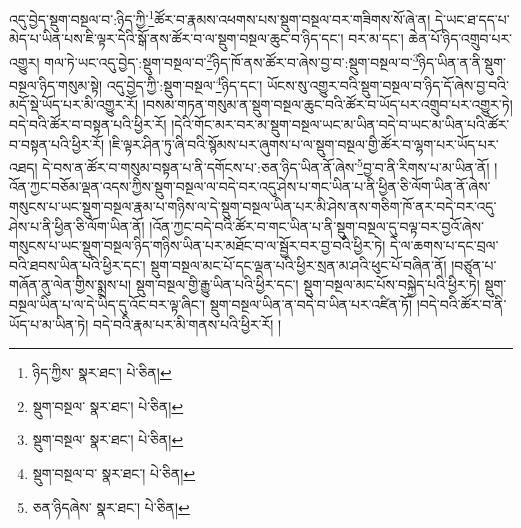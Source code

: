 འདུ་བྱེད་སྡུག་བསྔལ་བ་:ཉིད་ཀྱི་\footnote{ཉིད་ཀྱིས་  སྣར་ཐང་།  པེ་ཅིན། }ཚོར་བ་རྣམས་འཕགས་པས་སྡུག་བསྔལ་བར་གཟིགས་སོ་ཞེ་ན། དེ་ཡང་ཐ་དད་པ་མེད་པ་ཡིན་པས་ཇི་ལྟར་དེའི་སྒོ་ནས་ཚོར་བ་ལ་སྡུག་བསྔལ་ཆུང་བ་ཉིད་དང་། བར་མ་དང་། ཆེན་པོ་ཉིད་འགྲུབ་པར་འགྱུར། གལ་ཏེ་ཡང་འདུ་བྱེད་:སྡུག་བསྔལ་བ་\footnote{སྡུག་བསྔལ་  སྣར་ཐང་།  པེ་ཅིན། }ཉིད་ཁོ་ནས་ཚོར་བ་ཞེས་བྱ་བ་:སྡུག་བསྔལ་བ་\footnote{སྡུག་བསྔལ་  སྣར་ཐང་།  པེ་ཅིན། }ཉིད་ཡིན་ན་ནི་སྡུག་བསྔལ་ཉིད་གསུམ་སྟེ། འདུ་བྱེད་ཀྱི་:སྡུག་བསྔལ་\footnote{སྡུག་བསྔལ་བ་  སྣར་ཐང་།  པེ་ཅིན། }ཉིད་དང་། ཡོངས་སུ་འགྱུར་བའི་སྡུག་བསྔལ་བ་ཉིད་དོ་ཞེས་བྱ་བའི་མདོ་སྡེ་ཡོད་པར་མི་འགྱུར་རོ། །བསམ་གཏན་གསུམ་ན་སྡུག་བསྔལ་ཆུང་བའི་ཚོར་བ་ཡོད་པར་འགྲུབ་པར་འགྱུར་ཏེ། བདེ་བའི་ཚོར་བ་བསྟན་པའི་ཕྱིར་རོ། །དེའི་གོང་མར་བར་མ་སྡུག་བསྔལ་ཡང་མ་ཡིན་བདེ་བ་ཡང་མ་ཡིན་པའི་ཚོར་བ་བསྟན་པའི་ཕྱིར་རོ། །ཇི་ལྟར་ཤིན་ཏུ་ཞི་བའི་སྙོམས་པར་ཞུགས་པ་ལ་སྡུག་བསྔལ་གྱི་ཚོར་བ་ལྷག་པར་ཡོད་པར་འཐད། དེ་བས་ན་ཚོར་བ་གསུམ་བསྟན་པ་ནི་དགོངས་པ་:ཅན་ཉིད་ཡིན་ནོ་ཞེས་\footnote{ཅན་ཉིདཞེས་  སྣར་ཐང་།  པེ་ཅིན། }བྱ་བ་ནི་རིགས་པ་མ་ཡིན་ནོ། །འོན་ཀྱང་བཅོམ་ལྡན་འདས་ཀྱིས་སྡུག་བསྔལ་ལ་བདེ་བར་འདུ་ཤེས་པ་གང་ཡིན་པ་ནི་ཕྱིན་ཅི་ལོག་ཡིན་ནོ་ཞེས་གསུངས་པ་ཡང་སྡུག་བསྔལ་རྣམ་པ་གཉིས་ལ་དེ་སྡུག་བསྔལ་ཡིན་པར་མི་ཤེས་ནས་གཅིག་ཁོ་ནར་བདེ་བར་འདུ་ཤེས་པ་ནི་ཕྱིན་ཅི་ལོག་ཡིན་ནོ། །འོན་ཀྱང་བདེ་བའི་ཚོར་བ་གང་ཡིན་པ་ནི་སྡུག་བསྔལ་དུ་བལྟ་བར་བྱའོ་ཞེས་གསུངས་པ་ཡང་སྡུག་བསྔལ་ཉིད་གཉིས་ཡིན་པར་མཐོང་བ་ལ་སྦྱོར་བར་བྱ་བའི་ཕྱིར་ཏེ། དེ་ལ་ཆགས་པ་དང་བྲལ་བའི་ཐབས་ཡིན་པའི་ཕྱིར་དང་། སྡུག་བསྔལ་མང་པོ་དང་ལྡན་པའི་ཕྱིར་སྲན་མ་ཤའི་ཕུང་པོ་བཞིན་ནོ། །བཙུན་པ་གཞོན་ནུ་ལེན་གྱིས་སྨྲས་པ། སྡུག་བསྔལ་གྱི་རྒྱུ་ཡིན་པའི་ཕྱིར་དང་། སྡུག་བསྔལ་མང་པོས་བསྐྱེད་པའི་ཕྱིར་ཏེ། སྡུག་བསྔལ་ཡིན་པ་ལ་དེ་ཡིད་དུ་འོང་བར་ལྟ་ཞིང་། སྡུག་བསྔལ་ཡིན་ན་བདེ་བ་ཡིན་པར་འཛིན་ཏོ། །བདེ་བའི་ཚོར་བ་ནི་ཡོད་པ་མ་ཡིན་ཏེ། བདེ་བའི་རྣམ་པར་མི་གནས་པའི་ཕྱིར་རོ། །
